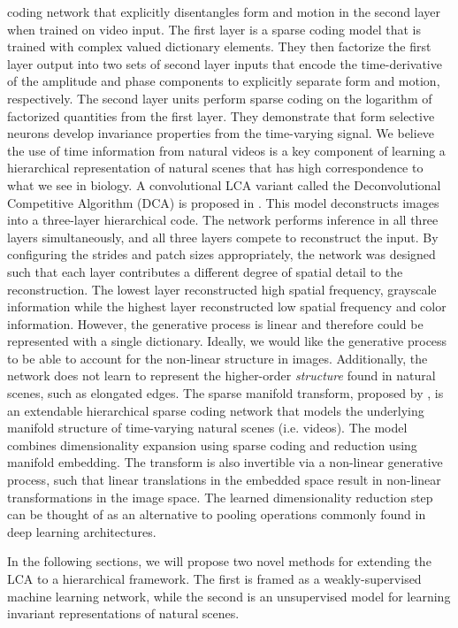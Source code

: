 coding network that explicitly disentangles form and motion in the second layer when trained on video input. The first layer is a sparse coding model that is trained with complex valued dictionary elements. They then factorize the first layer output into two sets of second layer inputs that encode the time-derivative of the amplitude and phase components to explicitly separate form and motion, respectively. The second layer units perform sparse coding on the logarithm of factorized quantities from the first layer. They demonstrate that form selective neurons develop invariance properties from the time-varying signal. We believe the use of time information from natural videos is a key component of learning a hierarchical representation of natural scenes that has high correspondence to what we see in biology. A convolutional LCA variant called the Deconvolutional Competitive Algorithm (DCA) is proposed in \parencite{paiton2015deconvolutional}. This model deconstructs images into a three-layer hierarchical code. The network performs inference in all three layers simultaneously, and all three layers compete to reconstruct the input. By configuring the strides and patch sizes appropriately, the network was designed such that each layer contributes a different degree of spatial detail to the reconstruction. The lowest layer reconstructed high spatial frequency, grayscale information while the highest layer reconstructed low spatial frequency and color information. However, the generative process is linear and therefore could be represented with a single dictionary. Ideally, we would like the generative process to be able to account for the non-linear structure in images. Additionally, the network does not learn to represent the higher-order \textit{structure} found in natural scenes, such as elongated edges. The sparse manifold transform, proposed by \parencite{chen2018sparse}, is an extendable hierarchical sparse coding network that models the underlying manifold structure of time-varying natural scenes (i.e. videos). The model combines dimensionality expansion using sparse coding and reduction using manifold embedding. The transform is also invertible via a non-linear generative process, such that linear translations in the embedded space result in non-linear transformations in the image space. The learned dimensionality reduction step can be thought of as an alternative to pooling operations commonly found in deep learning architectures.

In the following sections, we will propose two novel methods for extending the LCA to a hierarchical framework. The first is framed as a weakly-supervised machine learning network, while the second is an unsupervised model for learning invariant representations of natural scenes.

